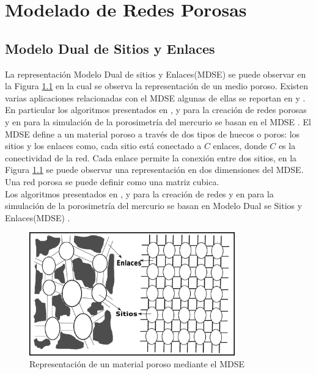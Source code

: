 \chapter{Modelado de Redes Porosas}
\label{champ:model}
\bigskip
\barra
\bigskip

\section{Modelo Dual de Sitios y Enlaces}
La representación Modelo Dual de sitios y Enlaces(MDSE) se puede observar en la Figura \ref{fig:dbsm} en la cual se observa la representación de un medio poroso. Existen varias aplicaciones relacionadas con el MDSE algunas de ellas se reportan en \cite{ref8} y \cite{ref10}. En particular los algoritmos presentados en \cite{ref2}, \cite{ref3} y \cite{ref4} para la creación de redes porosas y en \cite{ref7} para la simulación de la porosimetría del mercurio se basan en el MDSE \cite{ref1}. El MDSE define a un material poroso a través de dos tipos de huecos o poros: los sitios y los enlaces como, cada sitio está conectado a $C$ enlaces, donde $C$ es la conectividad de la red. Cada enlace permite la conexión entre dos sitios, en la Figura \ref{fig:dbsm} se puede observar  una representación en dos dimensiones del MDSE. Una red porosa se puede definir como una matriz cubica.\\

Los algoritmos presentados en \cite{ref2}, \cite{ref3} y \cite{ref4} para la creación de redes y en \cite{ref5} para la simulación de la porosimetría del mercurio se basan en Modelo Dual se Sitios y Enlaces(MDSE) \cite{ref1}. 

\begin{figure}[hbtp]
\centering
\includegraphics[width=3.5in]{img/dsbm_es.pdf}
\caption{Representación de un material poroso mediante el MDSE}
\label{fig:dbsm}
\end{figure}

 
